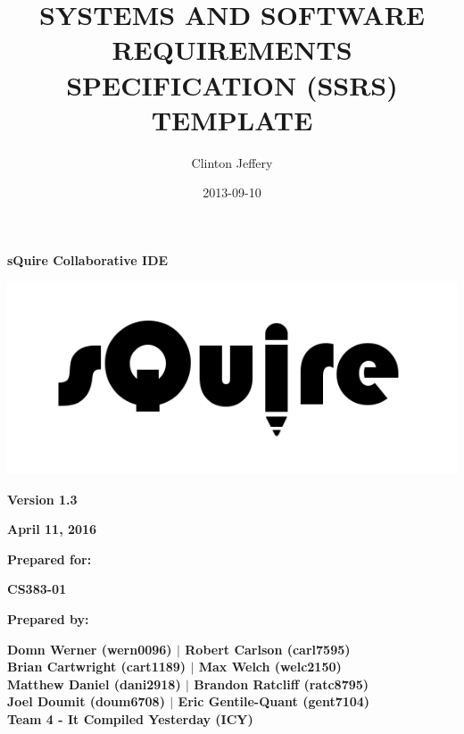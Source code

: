 \documentclass[twoside,letterpaper]{article}
\title{SYSTEMS AND SOFTWARE REQUIREMENTS SPECIFICATION (SSRS) TEMPLATE}
\author{Clinton Jeffery}
\date{2013-09-10}
\begin{document}
\clearpage\setcounter{page}{1}\pagestyle{Standard}




\bigskip

{\centering\bfseries
sQuire Collaborative IDE
\par}


\bigskip


\bigskip


\bigskip

\begin{center}
\includegraphics[width=6.0in]{images/sQuire-logo-transparent.png}
\end{center}

\bigskip


\bigskip

{\centering\bfseries
Version 1.3
\par}

{\centering\bfseries
April 11, 2016
\par}


\bigskip


\bigskip

{\centering\bfseries
Prepared for:
\par}

{\centering\bfseries
CS383-01
\par}


\bigskip


\bigskip

{\centering\bfseries
Prepared by:
\par}

{\centering\bfseries
Domn Werner (wern0096) $\vert$ Robert Carlson (carl7595) \\ Brian Cartwright (cart1189) $\vert$ Max Welch (welc2150) \\ Matthew Daniel (dani2918) $\vert$ Brandon Ratcliff (ratc8795) \\ Joel Doumit (doum6708) $\vert$ Eric Gentile-Quant (gent7104) \\
Team 4 - It Compiled Yesterday (ICY)
\par}
\end{document}
